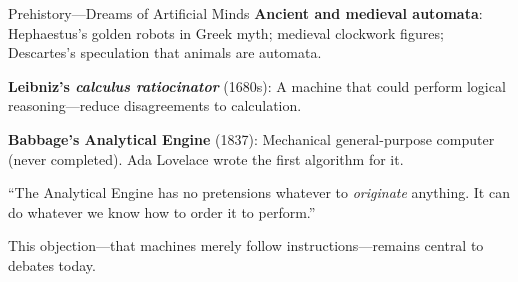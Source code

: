 \documentclass[aspectratio=169,11pt]{beamer}
\begin{document}
\begin{frame}{Prehistory---Dreams of Artificial Minds}
\textbf{Ancient and medieval automata}: Hephaestus's golden robots in Greek myth; medieval clockwork figures; Descartes's speculation that animals are automata.

\vspace{0.3em}
\textbf{Leibniz's \emph{calculus ratiocinator}} (1680s): A machine that could perform logical reasoning---reduce disagreements to calculation.

\vspace{0.3em}
\textbf{Babbage's Analytical Engine} (1837): Mechanical general-purpose computer (never completed). Ada Lovelace wrote the first algorithm for it.

\vspace{0.3em}
\begin{casestudybox}
\small
``The Analytical Engine has no pretensions whatever to \emph{originate} anything. It can do whatever we know how to order it to perform.''
\end{casestudybox}

This objection---that machines merely follow instructions---remains central to debates today.
\end{frame}
\end{document}
